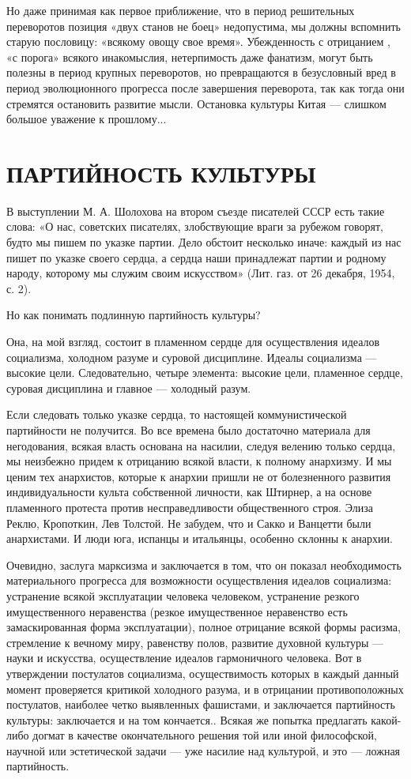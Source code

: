 Но даже принимая как первое приближение, что в период решительных
переворотов позиция «двух станов не боец» недопустима, мы должны
вспомнить старую пословицу: «всякому овощу свое время». Убежденность с
отрицанием , «с порога» всякого инакомыслия, нетерпимость даже
фанатизм, могут быть полезны в период крупных переворотов, но
превращаются в безусловный вред в период эволюционного прогресса после
завершения переворота, так как тогда они стремятся остановить развитие
мысли. Остановка культуры Китая --- слишком большое уважение к
прошлому...

\section{ПАРТИЙНОСТЬ КУЛЬТУРЫ}

В выступлении М. А. Шолохова на втором съезде писателей СССР есть
такие слова: «О нас, советских писателях, злобствующие враги за
рубежом говорят, будто мы пишем по указке партии. Дело обстоит
несколько иначе: каждый из нас пишет по указке своего сердца, а сердца
наши принадлежат партии и родному народу, которому мы служим своим
искусством» (Лит. газ. от 26 декабря, 1954, с. 2).

Но как понимать подлинную партийность культуры?

Она, на мой взгляд, состоит в пламенном сердце для осуществления
идеалов социализма, холодном разуме и суровой дисциплине. Идеалы
социализма --- высокие цели. Следовательно, четыре элемента: высокие
цели, пламенное сердце, суровая дисциплина и главное --- холодный
разум.

Если следовать только указке сердца, то настоящей коммунистической
партийности не получится. Во все времена было достаточно материала для
негодования, всякая власть основана на насилии, следуя велению только
сердца, мы неизбежно придем к отрицанию всякой власти, к полному
анархизму. И мы ценим тех анархистов, которые к анархии пришли не от
болезненного развития индивидуальности культа собственной личности,
как Штирнер, а на основе пламенного протеста против несправедливости
общественного строя. Элиза Реклю, Кропоткин, Лев Толстой. Не забудем,
что и Сакко и Ванцетти были анархистами. И люди юга, испанцы и
итальянцы, особенно склонны к анархии.

Очевидно, заслуга марксизма и заключается в том, что он показал
необходимость материального прогресса для возможности осуществления
идеалов социализма: устранение всякой эксплуатации человека человеком,
устранение резкого имущественного неравенства (резкое имущественное
неравенство есть замаскированная форма эксплуатации), полное отрицание
всякой формы расизма, стремление к вечному миру, равенству полов,
развитие духовной культуры --- науки и искусства, осуществление
идеалов гармоничного человека. Вот в утверждении постулатов
социализма, осуществимость которых в каждый данный момент проверяется
критикой холодного разума, и в отрицании противоположных постулатов,
наиболее четко выявленных фашистами, и заключается партийность
культуры: заключается и на том кончается.. Всякая же попытка
предлагать какой-либо догмат в качестве окончательного решения той или
иной философской, научной или эстетической задачи --- уже насилие над
культурой, и это --- ложная партийность.

